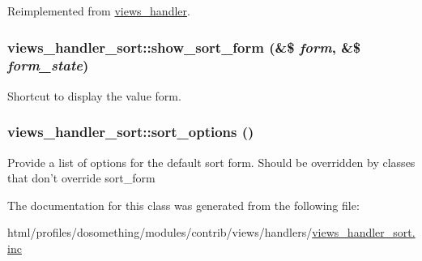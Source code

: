 Reimplemented from \hyperlink{classviews__handler_af519db20125fb4d1c0f7401692dcef0c}{views\_\-handler}.\hypertarget{classviews__handler__sort_a7099999bffa9bb2fa13ccbf5416606f3}{
\subsubsection[{show\_\-sort\_\-form}]{\setlength{\rightskip}{0pt plus 5cm}views\_\-handler\_\-sort::show\_\-sort\_\-form (\&\$ {\em form}, \/  \&\$ {\em form\_\-state})}}
\label{classviews__handler__sort_a7099999bffa9bb2fa13ccbf5416606f3}
Shortcut to display the value form. \hypertarget{classviews__handler__sort_aebff27163c4070d6eb378101dfb43b55}{
\subsubsection[{sort\_\-options}]{\setlength{\rightskip}{0pt plus 5cm}views\_\-handler\_\-sort::sort\_\-options ()}}
\label{classviews__handler__sort_aebff27163c4070d6eb378101dfb43b55}
Provide a list of options for the default sort form. Should be overridden by classes that don't override sort\_\-form 

The documentation for this class was generated from the following file:\begin{DoxyCompactItemize}
\item 
html/profiles/dosomething/modules/contrib/views/handlers/\hyperlink{views__handler__sort_8inc}{views\_\-handler\_\-sort.inc}\end{DoxyCompactItemize}
